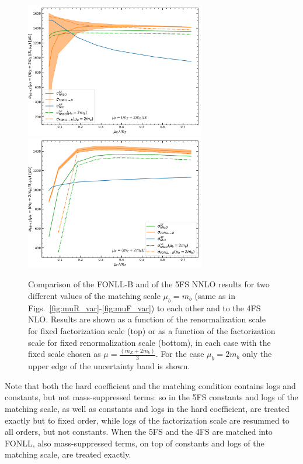 \documentclass[12pt]{article}
\begin{document}
\begin{figure}
  \begin{center}
    \includegraphics[width=0.7\textwidth]{m_muR_var.pdf}
    \includegraphics[width=0.7\textwidth]{m_muF_var.pdf} 
    \caption{\label{fig:m_mu_var} 
      Comparison of the FONLL-B  and of the 5FS NNLO results for two different
      values of the matching scale $\mu_b=m_b$ (same as in
      Figs.~\ref{fig:muR_var}-\ref{fig:muF_var}) to each other and to the
      4FS NLO. Results are shown as a function of the renormalization scale
      for fixed factorization scale (top) or as a function of the
      factorization scale for fixed renormalization scale (bottom), in each
      case with the fixed scale chosen as
      $\mu=\frac{(m_Z+2m_b)}{3}$. For the case $\mu_b=2m_b$ only the
      upper edge of the uncertainty band is shown.}
  \end{center}
\end{figure}

Note that both the
hard coefficient and the
matching condition contains logs and constants, but not
mass-suppressed terms: so in the 5FS constants and logs of the
matching scale, as well as constants and logs in the hard
coefficient, 
are treated exactly but to fixed order, while logs of the
factorization scale are  resummed to all
orders, but not constants. 
When the 5FS and the 4FS are matched into FONLL, also 
mass-suppressed terms, on top of constants
and logs of the matching scale, are treated
exactly.
\end{document}

